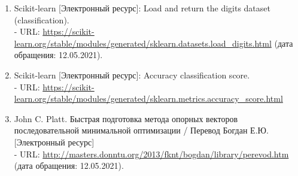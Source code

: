 \documentclass[12pt,a4paper]{article}
\begin{document}
\begin{enumerate}
    \item Scikit-learn [Электронный ресурс]: Load and return the digits dataset (classification). \\ - URL: \url{https://scikit-learn.org/stable/modules/generated/sklearn.datasets.load_digits.html} (дата обращения: 12.05.2021).
    \item Scikit-learn [Электронный ресурс]: Accuracy classification score. \\ - URL: \url{https://scikit-learn.org/stable/modules/generated/sklearn.metrics.accuracy_score.html} 
    \item John C. Platt. Быстрая подготовка метода опорных векторов последовательной минимальной оптимизации / Перевод Богдан Е.Ю. [Электронный ресурс]\\ - URL: \url{http://masters.donntu.org/2013/fknt/bogdan/library/perevod.htm} (дата обращения: 12.05.2021).
\end{enumerate}
\end{document}
